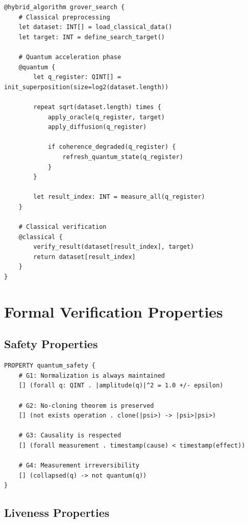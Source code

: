 \documentclass[12pt,a4paper]{article}
\begin{document}
\begin{lstlisting}[style=riftlang,caption={Hybrid Quantum-Classical Algorithm}]
@hybrid_algorithm grover_search {
    # Classical preprocessing
    let dataset: INT[] = load_classical_data()
    let target: INT = define_search_target()
    
    # Quantum acceleration phase
    @quantum {
        let q_register: QINT[] = init_superposition(size=log2(dataset.length))
        
        repeat sqrt(dataset.length) times {
            apply_oracle(q_register, target)
            apply_diffusion(q_register)
            
            if coherence_degraded(q_register) {
                refresh_quantum_state(q_register)
            }
        }
        
        let result_index: INT = measure_all(q_register)
    }
    
    # Classical verification
    @classical {
        verify_result(dataset[result_index], target)
        return dataset[result_index]
    }
}
\end{lstlisting}

\section{Formal Verification Properties}

\subsection{Safety Properties}

\begin{lstlisting}[style=riftlang,caption={Quantum Safety Invariants}]
PROPERTY quantum_safety {
    # G1: Normalization is always maintained
    [] (forall q: QINT . |amplitude(q)|^2 = 1.0 +/- epsilon)
    
    # G2: No-cloning theorem is preserved
    [] (not exists operation . clone(|psi>) -> |psi>|psi>)
    
    # G3: Causality is respected
    [] (forall measurement . timestamp(cause) < timestamp(effect))
    
    # G4: Measurement irreversibility
    [] (collapsed(q) -> not quantum(q))
}
\end{lstlisting}

\subsection{Liveness Properties}
\end{document}
